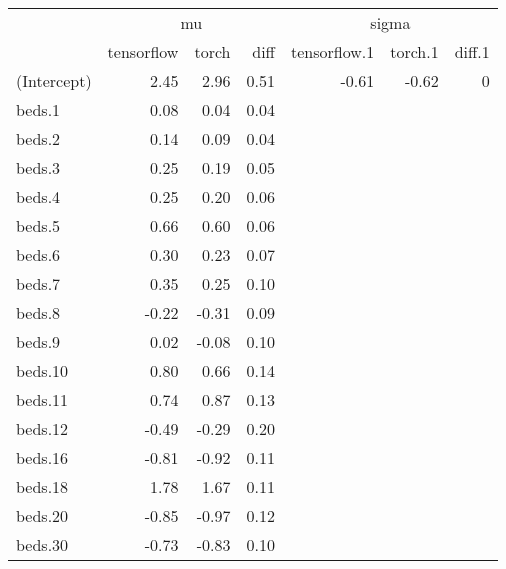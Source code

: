 
\begin{tabular}[t]{lrrrrrr}
\toprule
\multicolumn{1}{c}{ } & \multicolumn{3}{c}{mu} & \multicolumn{3}{c}{sigma} \\
\cmidrule(l{3pt}r{3pt}){2-4} \cmidrule(l{3pt}r{3pt}){5-7}
  & tensorflow & torch & diff & tensorflow.1 & torch.1 & diff.1\\
\midrule
(Intercept) & 2.45 & 2.96 & 0.51 & -0.61 & -0.62 & 0\\
beds.1 & 0.08 & 0.04 & 0.04 &  &  & \\
beds.2 & 0.14 & 0.09 & 0.04 &  &  & \\
beds.3 & 0.25 & 0.19 & 0.05 &  &  & \\
beds.4 & 0.25 & 0.20 & 0.06 &  &  & \\
\addlinespace
beds.5 & 0.66 & 0.60 & 0.06 &  &  & \\
beds.6 & 0.30 & 0.23 & 0.07 &  &  & \\
beds.7 & 0.35 & 0.25 & 0.10 &  &  & \\
beds.8 & -0.22 & -0.31 & 0.09 &  &  & \\
beds.9 & 0.02 & -0.08 & 0.10 &  &  & \\
\addlinespace
beds.10 & 0.80 & 0.66 & 0.14 &  &  & \\
beds.11 & 0.74 & 0.87 & 0.13 &  &  & \\
beds.12 & -0.49 & -0.29 & 0.20 &  &  & \\
beds.16 & -0.81 & -0.92 & 0.11 &  &  & \\
beds.18 & 1.78 & 1.67 & 0.11 &  &  & \\
\addlinespace
beds.20 & -0.85 & -0.97 & 0.12 &  &  & \\
beds.30 & -0.73 & -0.83 & 0.10 &  &  & \\
\bottomrule
\end{tabular}
